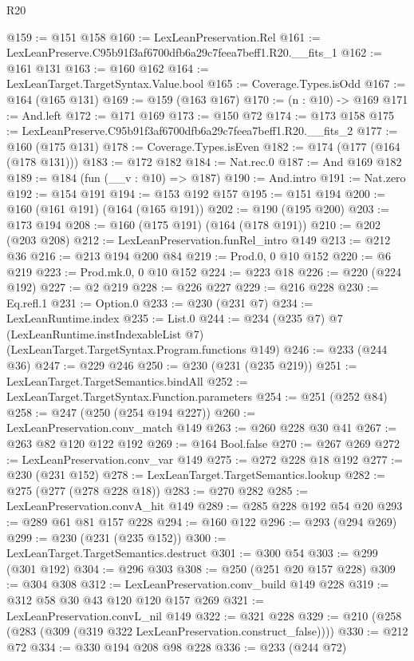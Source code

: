 \begin{lexlean}{R20}
\begin{coremodule}
@159 := @151 @158
@160 := LexLeanPreservation.Rel
@161 := LexLeanPreserve.C95b91f3af6700dfb6a29c7feea7beff1.R20.__fits_1
@162 := @161 @131
@163 := @160 @162
@164 := LexLeanTarget.TargetSyntax.Value.bool
@165 := Coverage.Types.isOdd
@167 := @164 (@165 @131)
@169 := @159 (@163 @167)
@170 := (n : @10) -> @169
@171 := And.left
@172 := @171 @169
@173 := @150 @72
@174 := @173 @158
@175 := LexLeanPreserve.C95b91f3af6700dfb6a29c7feea7beff1.R20.__fits_2
@177 := @160 (@175 @131)
@178 := Coverage.Types.isEven
@182 := @174 (@177 (@164 (@178 @131)))
@183 := @172 @182
@184 := Nat.rec.{0}
@187 := And @169 @182
@189 := @184 (fun (__v : @10) => @187)
@190 := And.intro
@191 := Nat.zero
@192 := @154 @191
@194 := @153 @192 @157
@195 := @151 @194
@200 := @160 (@161 @191) (@164 (@165 @191))
@202 := @190 (@195 @200)
@203 := @173 @194
@208 := @160 (@175 @191) (@164 (@178 @191))
@210 := @202 (@203 @208)
@212 := LexLeanPreservation.funRel_intro @149
@213 := @212 @36
@216 := @213 @194 @200 @84
@219 := Prod.{0, 0} @10 @152
@220 := @6 @219
@223 := Prod.mk.{0, 0} @10 @152
@224 := @223 @18
@226 := @220 (@224 @192)
@227 := @2 @219
@228 := @226 @227
@229 := @216 @228
@230 := Eq.refl.{1}
@231 := Option.{0}
@233 := @230 (@231 @7)
@234 := LexLeanRuntime.index
@235 := List.{0}
@244 := @234
    (@235 @7)
    @7
    (LexLeanRuntime.instIndexableList @7)
    (LexLeanTarget.TargetSyntax.Program.functions @149)
@246 := @233 (@244 @36)
@247 := @229 @246
@250 := @230 (@231 (@235 @219))
@251 := LexLeanTarget.TargetSemantics.bindAll
@252 := LexLeanTarget.TargetSyntax.Function.parameters
@254 := @251 (@252 @84)
@258 := @247 (@250 (@254 @194 @227))
@260 := LexLeanPreservation.conv_match @149
@263 := @260 @228 @30 @41
@267 := @263 @82 @120 @122 @192
@269 := @164 Bool.false
@270 := @267 @269
@272 := LexLeanPreservation.conv_var @149
@275 := @272 @228 @18 @192
@277 := @230 (@231 @152)
@278 := LexLeanTarget.TargetSemantics.lookup
@282 := @275 (@277 (@278 @228 @18))
@283 := @270 @282
@285 := LexLeanPreservation.convA_hit @149
@289 := @285 @228 @192 @54 @20
@293 := @289 @61 @81 @157 @228
@294 := @160 @122
@296 := @293 (@294 @269)
@299 := @230 (@231 (@235 @152))
@300 := LexLeanTarget.TargetSemantics.destruct
@301 := @300 @54
@303 := @299 (@301 @192)
@304 := @296 @303
@308 := @250 (@251 @20 @157 @228)
@309 := @304 @308
@312 := LexLeanPreservation.conv_build @149 @228
@319 := @312 @58 @30 @43 @120 @120 @157 @269
@321 := LexLeanPreservation.convL_nil @149
@322 := @321 @228
@329 := @210 (@258 (@283 (@309 (@319 @322 LexLeanPreservation.construct_false))))
@330 := @212 @72
@334 := @330 @194 @208 @98 @228
@336 := @233 (@244 @72)

\end{coremodule}
\end{lexlean}
